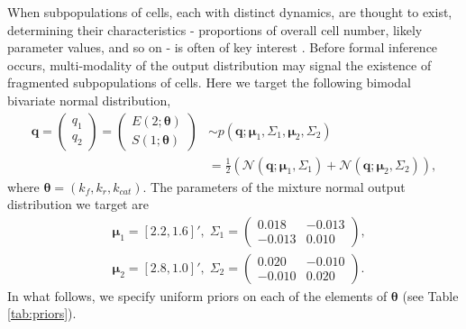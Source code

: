 When subpopulations of cells, each with distinct dynamics, are thought to exist, determining their characteristics - proportions of overall cell number, likely parameter values, and so on - is often of key interest \cite{hasenauer2011identification,loos2018hierarchical}. Before formal inference occurs, multi-modality of the output distribution may signal the existence of fragmented subpopulations of cells. Here we target the following bimodal bivariate normal distribution,
%
\begin{align}
\boldsymbol{q} = \begin{pmatrix} q_1 \\ q_2 \end{pmatrix}
 = \begin{pmatrix} E(2; \boldsymbol{\theta}) \\ S(1; \boldsymbol{\theta}) \end{pmatrix}
&  \sim
p(\boldsymbol{q}; \boldsymbol{\mu}_1,\Sigma_1, \boldsymbol{\mu}_2, \Sigma_2) \\
&= \frac{1}{2}\left(\mathcal{N}(\boldsymbol{q}; \boldsymbol{\mu}_1,\Sigma_1)
+ \mathcal{N}(\boldsymbol{q}; \boldsymbol{\mu}_2,\Sigma_2)\right),
\end{align}
%
where $\boldsymbol{\theta}=(k_f,k_r,k_{cat})$. The parameters of the mixture normal output distribution we target are
\begin{equation*}
\begin{aligned}
&\boldsymbol{\mu}_1=[2.2, 1.6]', \; \Sigma_1 = \begin{pmatrix}0.018 & -0.013 \\ -0.013 & 0.010 \end{pmatrix}, \\
&\boldsymbol{\mu}_2=[2.8, 1.0]', \; \Sigma_2 = \begin{pmatrix}0.020 & -0.010 \\ -0.010 & 0.020 \end{pmatrix}.
\end{aligned}
\end{equation*}
In what follows, we specify uniform priors on each of the elements of $\boldsymbol{\theta}$ (see Table \ref{tab:priors}).


